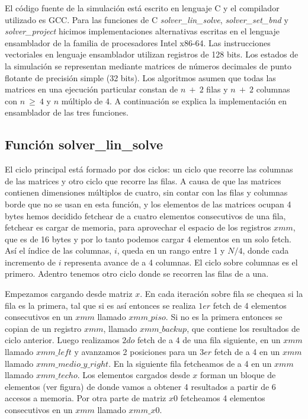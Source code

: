 El código fuente de la simulación está escrito en lenguaje C y el compilador utilizado es GCC. Para las funciones de C \textit{solver\_lin\_solve}, \textit{solver\_set\_bnd} y \textit{solver\_project} hicimos implementaciones alternativas escritas en el lenguaje ensamblador de la familia de procesadores Intel x86-64. Las instrucciones vectoriales en lenguaje ensamblador utilizan registros de 128 bits. Los estados de la simulación se representan mediante matrices de números decimales de punto flotante de precisión simple (32 bits). Los algoritmos asumen que todas las matrices en una ejecución particular constan de $n\ +\ 2$ filas y $n\ +\ 2$ columnas con $n\ \geq\ 4$ y $n$ múltiplo de 4. A continuación se explica la implementación en ensamblador de las tres funciones.
\subsection{Función solver\_lin\_solve}
 El ciclo principal está formado por dos ciclos: un ciclo que recorre las columnas de las matrices y
 otro ciclo que recorre las filas. A causa de que las matrices contienen dimensiones múltiplos de 
 cuatro, sin contar con las filas y columnas borde que no se usan en esta función, y los elementos
 de las matrices ocupan 4 bytes hemos decidido fetchear de a cuatro elementos consecutivos
 de una fila, fetchear es cargar de memoria, para aprovechar el espacio de los registros $xmm$, que es
 de 16 bytes y por lo tanto podemos cargar 4 elementos en un solo fetch. Así el índice de
 las columnas, $i$, queda en un rango entre 1 y $N/4$, donde cada incremento de $i$ representa avance de a 4 columnas. El ciclo sobre columnas es el primero.  
 Adentro tenemos otro ciclo donde se recorren las filas de a una. 

Empezamos cargando desde matriz $x$.
 En cada iteración sobre fila se chequea si la fila es la primera, tal que si es así entonces 
 se realiza $1er$ fetch de 4 elementos consecutivos en un $xmm$ llamado $xmm\_piso$. Si no es la 
 primera entonces se copian de un registro $xmm$, llamado $xmm\_backup$, que contiene los 
 resultados de ciclo anterior.
Luego realizamos $2do$ fetch de a 4 de una fila siguiente, en un $xmm$ llamado
 $xmm\_left$ y avanzamos 2 posiciones para un $3er$ fetch de a 4 en un $xmm$ llamado $xmm\_medio\_y\_right$.
 En la siguiente fila fetcheamos de a 4 en un $xmm$ llamado $xmm\_techo$. Los elementos cargados desde $x$
 forman un bloque de elementos (ver figura) de donde vamos a obtener 4 resultados a partir de 6 
 accesos a memoria.
 Por otra parte de matriz $x0$ fetcheamos 4 elementos consecutivos en un $xmm$ llamado $xmm\_x0$.

